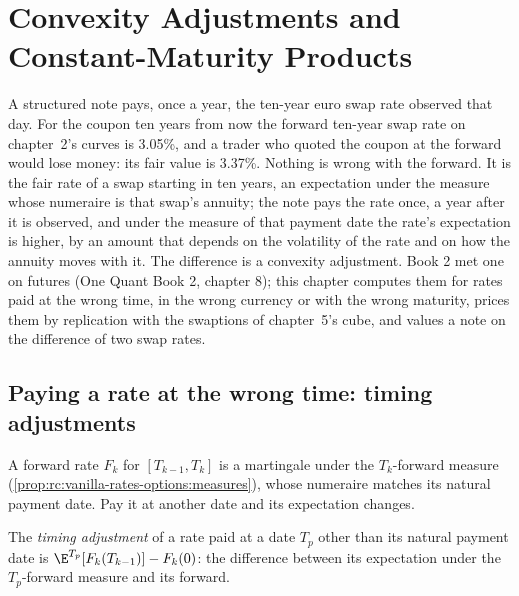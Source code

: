 \chapter{Convexity Adjustments and Constant-Maturity Products}\label{ch:rc:convexity-adjustments-and-constant-maturity-products}

A structured note pays, once a year, the ten-year euro swap rate observed that
day. For the coupon ten years from now the forward ten-year swap rate on
chapter~2's curves is 3.05\%, and a trader who quoted the coupon at the
forward would lose money: its fair value is 3.37\%. Nothing is wrong with the
forward. It is the fair rate of a swap starting in ten years, an expectation
under the measure whose numeraire is that swap's annuity; the note pays the
rate once, a year after it is observed, and under the measure of that
payment date the rate's expectation is higher, by an amount that depends on
the volatility of the rate and on how the annuity moves with it. The
difference is a convexity adjustment. Book 2 met one on futures (One Quant
Book 2, chapter 8); this chapter computes them for rates paid at the wrong
time, in the wrong currency or with the wrong maturity, prices them by
replication with the swaptions of chapter~5's cube, and values a note on the
difference of two swap rates.

\section{Paying a rate at the wrong time: timing adjustments}

A forward rate $F_k$ for $[T_{k-1},T_k]$ is a martingale under the
$T_k$-forward measure (\cref{prop:rc:vanilla-rates-options:measures}), whose
numeraire matches its natural payment date. Pay it at another date and its
expectation changes.

\begin{definition}\label{def:rc:convexity-adjustments-and-constant-maturity-products:timing}
The \emph{timing adjustment} of a rate paid at a date
$T_p$ other than its natural payment date is
$\E^{T_p}[F_k(T_{k-1})]-F_k(0)$: the difference between its expectation under
the $T_p$-forward measure and its forward.
\end{definition}

